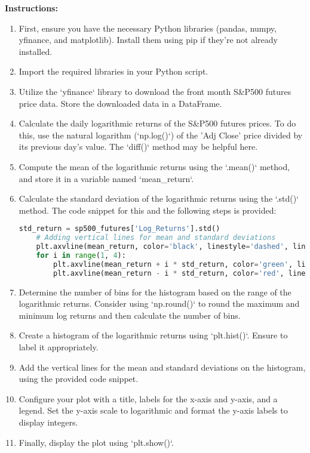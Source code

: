 \documentclass{article}
\begin{document}
\textbf{Instructions:}
\begin{enumerate}
    \item First, ensure you have the necessary Python libraries (pandas, numpy, yfinance, and matplotlib). Install them using pip if they're not already installed.

    \item Import the required libraries in your Python script.

    \item Utilize the `yfinance` library to download the front month S\&P500 futures price data. Store the downloaded data in a DataFrame.

    \item Calculate the daily logarithmic returns of the S\&P500 futures prices. To do this, use the natural logarithm (`np.log()`) of the 'Adj Close' price divided by its previous day's value. The `diff()` method may be helpful here.

    \item Compute the mean of the logarithmic returns using the `.mean()` method, and store it in a variable named `mean\_return`.

    \item Calculate the standard deviation of the logarithmic returns using the `.std()` method. The code snippet for this and the following steps is provided:
    \begin{lstlisting}[language=Python]
    std_return = sp500_futures['Log_Returns'].std()
    # Adding vertical lines for mean and standard deviations
    plt.axvline(mean_return, color='black', linestyle='dashed', linewidth=2, label="Mean Return")
    for i in range(1, 4):
        plt.axvline(mean_return + i * std_return, color='green', linestyle='dashed', linewidth=1, label=f"+{i} STD")
        plt.axvline(mean_return - i * std_return, color='red', linestyle='dashed', linewidth=1, label=f"-{i} STD")
    \end{lstlisting}

    \item Determine the number of bins for the histogram based on the range of the logarithmic returns. Consider using `np.round()` to round the maximum and minimum log returns and then calculate the number of bins.

    \item Create a histogram of the logarithmic returns using `plt.hist()`. Ensure to label it appropriately.

    \item Add the vertical lines for the mean and standard deviations on the histogram, using the provided code snippet.

    \item Configure your plot with a title, labels for the x-axis and y-axis, and a legend. Set the y-axis scale to logarithmic and format the y-axis labels to display integers.

    \item Finally, display the plot using `plt.show()`.
\end{enumerate}
\end{document}
